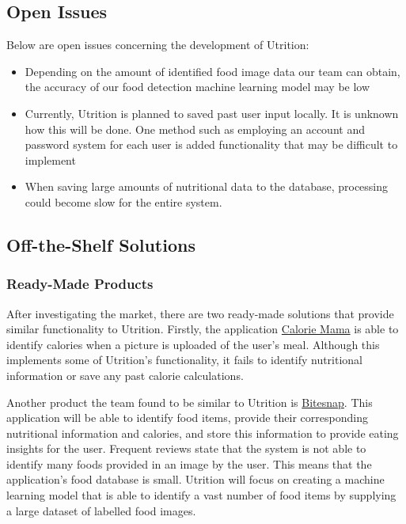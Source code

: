 \documentclass[12pt]{article}
\begin{document}
\subsection{Open Issues}
Below are open issues concerning the development of Utrition:
\begin{itemize}
	\item Depending on the amount of identified food image data our team can obtain, the accuracy of our food detection machine learning model may be low
	\item Currently, Utrition is planned to saved past user input locally. It is unknown how this will be done. One method such as employing an account and password system for each user is added functionality that may be difficult to implement 
	\item When saving large amounts of nutritional data to the database, processing could become slow for the entire system.
\end{itemize}

\subsection{Off-the-Shelf Solutions}
\subsubsection{Ready-Made Products}
After investigating the market, there are two ready-made solutions that provide similar functionality to Utrition. Firstly, the application \href{https://www.caloriemama.ai/#Categories}{Calorie Mama} is able to identify calories when a picture is uploaded of the user's meal. Although this implements some of Utrition's functionality, it fails to identify nutritional information or save any past calorie calculations.

Another product the team found to be similar to Utrition is \href{https://play.google.com/store/apps/details?id=ai.bite.biteapp&hl=en_US&gl=US}{Bitesnap}. This application will be able to identify food items, provide their corresponding nutritional information and calories, and store this information to provide eating insights for the user. Frequent reviews state that the system is not able to identify many foods provided in an image by the user. This means that the application's food database is small. Utrition will focus on creating a machine learning model that is able to identify a vast number of food items by supplying a large dataset of labelled food images. 
\end{document}
